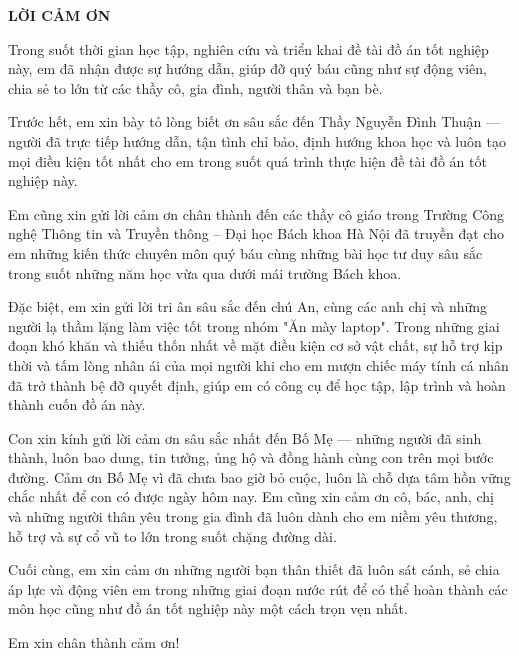 \documentclass[../DoAn.tex]{subfiles}
\begin{document}
\begin{center}
    {\bfseries\Large LỜI CẢM ƠN}
\end{center}
\vspace{1cm}

Trong suốt thời gian học tập, nghiên cứu và triển khai đề tài đồ án tốt nghiệp này, em đã nhận được sự hướng dẫn, giúp đỡ quý báu cũng như sự động viên, chia sẻ to lớn từ các thầy cô, gia đình, người thân và bạn bè.

Trước hết, em xin bày tỏ lòng biết ơn sâu sắc đến Thầy Nguyễn Đình Thuận — người đã trực tiếp hướng dẫn, tận tình chỉ bảo, định hướng khoa học và luôn tạo mọi điều kiện tốt nhất cho em trong suốt quá trình thực hiện đề tài đồ án tốt nghiệp này.

Em cũng xin gửi lời cảm ơn chân thành đến các thầy cô giáo trong Trường Công nghệ Thông tin và Truyền thông – Đại học Bách khoa Hà Nội đã truyền đạt cho em những kiến thức chuyên môn quý báu cùng những bài học tư duy sâu sắc trong suốt những năm học vừa qua dưới mái trường Bách khoa.

Đặc biệt, em xin gửi lời tri ân sâu sắc đến chú An, cùng các anh chị và những người lạ thầm lặng làm việc tốt trong nhóm "Ăn mày laptop". Trong những giai đoạn khó khăn và thiếu thốn nhất về mặt điều kiện cơ sở vật chất, sự hỗ trợ kịp thời và tấm lòng nhân ái của mọi người khi cho em mượn chiếc máy tính cá nhân đã trở thành bệ đỡ quyết định, giúp em có công cụ để học tập, lập trình và hoàn thành cuốn đồ án này.

Con xin kính gửi lời cảm ơn sâu sắc nhất đến Bố Mẹ — những người đã sinh thành, luôn bao dung, tin tưởng, ủng hộ và đồng hành cùng con trên mọi bước đường. Cảm ơn Bố Mẹ vì đã chưa bao giờ bỏ cuộc, luôn là chỗ dựa tâm hồn vững chắc nhất để con có được ngày hôm nay. Em cũng xin cảm ơn cô, bác, anh, chị và những người thân yêu trong gia đình đã luôn dành cho em niềm yêu thương, hỗ trợ và sự cổ vũ to lớn trong suốt chặng đường dài.

Cuối cùng, em xin cảm ơn những người bạn thân thiết đã luôn sát cánh, sẻ chia áp lực và động viên em trong những giai đoạn nước rút để có thể hoàn thành các môn học cũng như đồ án tốt nghiệp này một cách trọn vẹn nhất.

Em xin chân thành cảm ơn!
\end{document}
